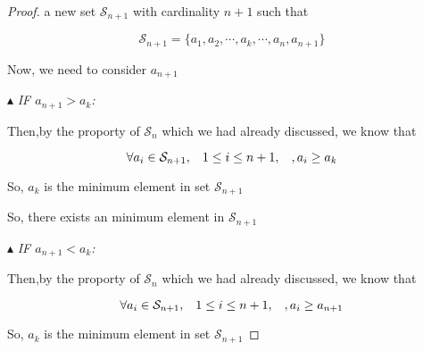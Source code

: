 \documentclass[12pt]{article}
\begin{document}
\begin{proof}
    \vspace*{0.3cm}
    \hspace*{1.2cm}
    a new set $ \mathcal{S}_{n+1}$ with cardinality $n+1$ such that

    \[ \mathcal{S}_{n+1} = \lbrace a_1, a_2, \cdots, a_k, \cdots, a_n, a_{n+1} \rbrace \] 

    \vspace*{0.3cm}
    \hspace*{1.2cm}
    Now, we need to consider $a_{n+1}$

    \vspace*{0.3cm}
    \hspace*{2cm}
    $\blacktriangle$ \textit{IF $a_{n+1} > a_k$:}

    \vspace*{0.3cm}
    \hspace*{2cm}
    Then,by the proporty of $\mathcal{S}_n$ which we had already discussed, we know that

    \[ \forall a_i \in \mathcal{S}_{n+1}, \hspace*{0.3cm} 1 \leq i \leq n+1, \hspace*{0.3cm}, a_i \geq a_k \]

    \vspace*{0.3cm}
    \hspace*{2cm}
    So, $a_k$ is the minimum element in set $\mathcal{S}_{n+1}$

    \vspace*{0.3cm}
    \hspace*{2cm}
    So, there exists an minimum element in $\mathcal{S}_{n+1}$

    \vspace*{0.3cm}
    \hspace*{2cm}
    $\blacktriangle$ \textit{IF $a_{n+1} < a_k$:}

    \vspace*{0.3cm}
    \hspace*{2cm}
    Then,by the proporty of $\mathcal{S}_n$ which we had already discussed, we know that

    \[ \forall a_i \in \mathcal{S}_{n+1}, \hspace*{0.3cm} 1 \leq i \leq n+1, \hspace*{0.3cm}, a_i \geq a_{n+1} \]

    \vspace*{0.3cm}
    \hspace*{2cm}
    So, $a_k$ is the minimum element in set $\mathcal{S}_{n+1}$


\end{proof}
\end{document}
